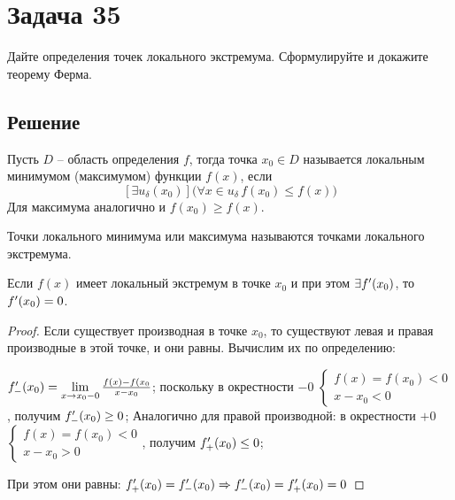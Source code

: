 \section*{Задача 35}

Дайте определения точек локального экстремума. Сформулируйте и докажите
теорему Ферма.

\subsection*{Решение}
\begin{defi}
    Пусть $D$ -- область определения $f$, тогда точка $x_0 \in D$
    называется локальным минимумом (максимумом) функции $f(x)$, если
    $$
        [\exists u_{\delta}(x_0)]\big(\forall x \in u_{\delta} \, f(x_0)
        \leq f(x) \big)
    $$
    Для максимума аналогично и $f(x_0) \geq f(x)$.
\end{defi}

\begin{defi}
    Точки локального минимума или максимума называются точками локального
    экстремума.
\end{defi}

\begin{ther}
    Если $f(x)$ имеет локальный экстремум в точке $x_0$ и при этом $\exists
    f^{\prime}(x_0)$, то $f^{\prime}(x_0) = 0$.
\end{ther}

\begin{proof}
    Если существует производная в точке $x_0$, то существуют левая и правая
    производные в этой точке, и они равны. Вычислим их по определению:\par
    $f_{-}^{\prime}(x_0) = \lim\limits_{x \to x_0 - 0}\frac{f(x)-f(x_0}{x-x_0}$;
    поскольку в окрестности $-0$
    $
    \begin{cases}
        f(x) = f(x_0) < 0 \\
        x - x_0 < 0
    \end{cases}
    $, получим $f_{-}^{\prime}(x_0) \geq 0$;
    Аналогично для правой производной: в окрестности $+0$
    $
    \begin{cases}
        f(x) = f(x_0) < 0 \\
        x - x_0 > 0
    \end{cases}
    $, получим $f_{+}^{\prime}(x_0) \leq 0$;\par
    При этом они равны: $f_{+}^{\prime}(x_0) = f_{-}^{\prime}(x_0) \Rightarrow f_{-}^{\prime}(x_0) =
    f_{+}^{\prime}(x_0) = 0$
\end{proof}

